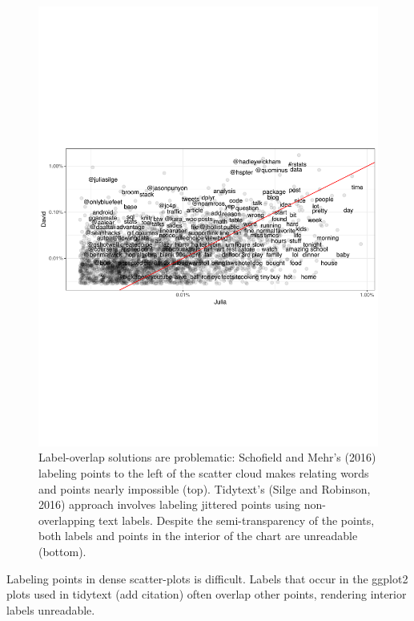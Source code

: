 \documentclass[11pt]{article}
\begin{document}
\begin{figure}[h]
\includegraphics[width=\columnwidth]{tidytext}
\vspace{-1cm}
\caption{Label-overlap solutions are problematic: Schofield and Mehr's (2016) labeling points to the left of the scatter cloud makes relating words and points nearly impossible (top). Tidytext's (Silge and Robinson, 2016) approach involves labeling jittered points using non-overlapping text labels.  Despite the semi-transparency of the points, both labels and points in the interior of the chart are unreadable (bottom).
} 
\vspace{-0.5cm}
\end{figure}

\cite{tidytext}
Labeling points in dense scatter-plots is difficult.  Labels that occur in the 
ggplot2 plots used in tidytext (add citation) often overlap other points, rendering interior labels unreadable. 
\end{document}
